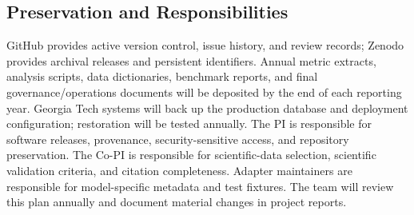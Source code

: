 \subsection*{Preservation and Responsibilities}

GitHub provides active version control, issue history, and review records;
Zenodo provides archival releases and persistent identifiers. Annual metric
extracts, analysis scripts, data dictionaries, benchmark reports, and final
governance/operations documents will be deposited by the end of each reporting
year. Georgia Tech systems will back up the production database and deployment
configuration; restoration will be tested annually. The PI is responsible for
software releases, provenance, security-sensitive access, and repository
preservation. The Co-PI is responsible for scientific-data selection,
scientific validation criteria, and citation completeness. Adapter maintainers
are responsible for model-specific metadata and test fixtures. The team will
review this plan annually and document material changes in project reports.
